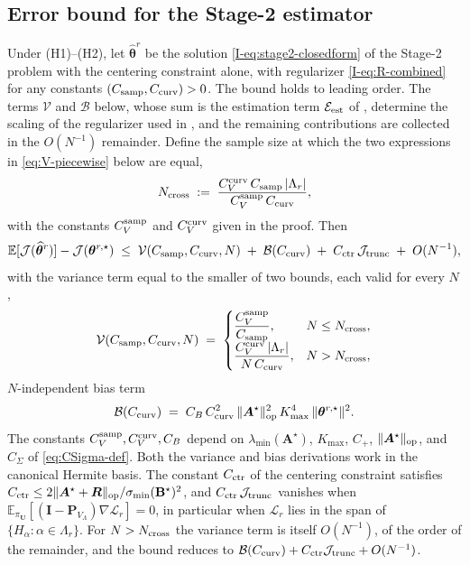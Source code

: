 \documentclass[review,hidelinks,onefignum,onetabnum]{siamart251216}
\newcommand{\EE}{\mathbb{E}}
\newcommand{\mA}{\bm{A}}
\newcommand{\mP}{\bm{P}}
\newcommand{\mI}{\bm{I}}
\newcommand{\mR}{\bm{R}}
\newcommand{\hvbeta}{\widehat{\bm{\theta}}^{r}}
\newcommand{\vU}{\bm{U}}
\newcommand{\scL}{\mathcal{L}}
\begin{document}
\subsection{Error bound for the Stage-2 estimator}
\label{app:excess-fisher}

\begin{theorem}
\label{thm:ccsm-rate}
Under (H1)--(H2), let $\hvbeta$ be the solution \eqref{I-eq:stage2-closedform} of the Stage-2 problem with the centering constraint alone, with regularizer \eqref{I-eq:R-combined} for any constants $(C_{\rm samp}, C_{\rm curv}) > 0$. The bound holds to leading order. The terms $\mathcal V$ and $\mathcal B$ below, whose sum is the estimation term $\mathcal E_{\rm est}$ of , determine the scaling of the regularizer used in , and the remaining contributions are collected in the $O(N^{-1})$ remainder. Define the sample size at which the two expressions in \eqref{eq:V-piecewise} below are equal,
\begin{equation}
  N_{\rm cross}
  \;:=\;
  \frac{C_V^{\rm curv}\,C_{\rm samp}\,|\Lambda_r|}{C_V^{\rm samp}\,C_{\rm curv}},
  \label{eq:Ncross}
\end{equation}
with the constants $C_V^{\rm samp}$ and $C_V^{\rm curv}$ given in the proof.
Then
\begin{equation}
  \EE[\mathcal J(\hvbeta)] - \mathcal J(\bm\theta^{r,\star})
  \;\le\;
  \mathcal V(C_{\rm samp}, C_{\rm curv}, N)
  \;+\;
  \mathcal B(C_{\rm curv})
  \;+\;
  C_{\rm ctr}\,\mathcal J_{\rm trunc}
  \;+\; O(N^{-1}),
  \label{eq:ccsm-rate}
\end{equation}
with the variance term equal to the smaller of two bounds, each valid for every $N$,
\begin{equation}
  \mathcal V(C_{\rm samp}, C_{\rm curv}, N)
  \;=\;
  \begin{cases}
    \dfrac{C_V^{\rm samp}}{C_{\rm samp}}, & N \le N_{\rm cross}, \\[4pt]
    \dfrac{C_V^{\rm curv}\,|\Lambda_r|}{N\,C_{\rm curv}}, & N > N_{\rm cross},
  \end{cases}
  \label{eq:V-piecewise}
\end{equation}
$N$-independent bias term
\begin{equation}
  \mathcal B(C_{\rm curv})
  \;=\;
  C_B\,C_{\rm curv}^2\,\|\mA^\star\|_{\rm op}^2\,K_{\max}^4\,\|\bm\theta^{r,\star}\|^2.
  \label{eq:B-bound}
\end{equation}
The constants $C_V^{\rm samp}, C_V^{\rm curv}, C_B$ depend on $\lambda_{\min}(\mA^\star)$, $K_{\max}$, $C_+$, $\|\mA^\star\|_{\rm op}$, and $C_\Sigma$ of \eqref{eq:CSigma-def}. Both the variance and bias derivations work in the canonical Hermite basis. The constant $C_{\rm ctr}$ of the centering constraint satisfies $C_{\rm ctr} \le 2\|\mA^\star + \mR\|_{\rm op}/\sigma_{\min}(\mathbf B^\star)^2$, and $C_{\rm ctr}\,\mathcal J_{\rm trunc}$ vanishes when $\EE_{\pi_{\vU}}[(\mI-\mP_{V_\Lambda})\nabla\scL_r] = 0$, in particular when $\scL_r$ lies in the span of $\{H_\alpha : \alpha\in\Lambda_r\}$. For $N > N_{\rm cross}$ the variance term is itself $O(N^{-1})$, of the order of the remainder, and the bound reduces to $\mathcal B(C_{\rm curv}) + C_{\rm ctr}\mathcal J_{\rm trunc} + O(N^{-1})$.

\end{theorem}
\end{document}
